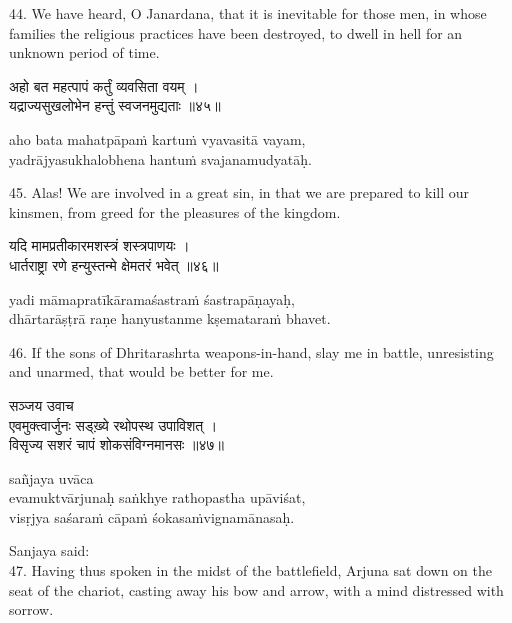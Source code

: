 44. We have heard, O Janardana, that it is inevitable for those men, in whose
families the religious practices have been destroyed, to dwell in hell for an
unknown period of time.

\begin{gitaverse}
अहो बत महत्पापं कर्तुं व्यवसिता वयम् । \\
यद्राज्यसुखलोभेन हन्तुं स्वजनमुद्यताः ॥४५॥
\end{gitaverse}

\begin{transliteration}
aho bata mahatpāpaṁ kartuṁ vyavasitā vayam, \\
yadrājyasukhalobhena hantuṁ svajanamudyatāḥ.
\end{transliteration}

45. Alas! We are involved in a great sin, in that we are prepared to kill our
kinsmen, from greed for the pleasures of the kingdom.

\begin{gitaverse}
यदि मामप्रतीकारमशस्त्रं शस्त्रपाणयः । \\
धार्तराष्ट्रा रणे हन्युस्तन्मे क्षेमतरं भवेत् ॥४६॥
\end{gitaverse}

\begin{transliteration}
yadi māmapratīkāramaśastraṁ śastrapāṇayaḥ, \\
dhārtarāṣṭrā raṇe hanyustanme kṣemataraṁ bhavet.
\end{transliteration}

46. If the sons of Dhritarashrta weapons-in-hand, slay me in battle,
unresisting and unarmed, that would be better for me.

\begin{gitaverse}
सञ्जय उवाच \\
एवमुक्त्वार्जुनः सड्ख़्ये रथोपस्थ उपाविशत् । \\
विसृज्य सशरं चापं शोकसंविग्नमानसः ॥४७॥
\end{gitaverse}

\begin{transliteration}
sañjaya uvāca \\
evamuktvārjunaḥ saṅkhye rathopastha upāviśat, \\
visṛjya saśaraṁ cāpaṁ śokasaṁvignamānasaḥ.
\end{transliteration}

Sanjaya said: \\
47. Having thus spoken in the midst of the battlefield, Arjuna sat down on the
seat of the chariot, casting away his bow and arrow, with a mind distressed
with sorrow.

